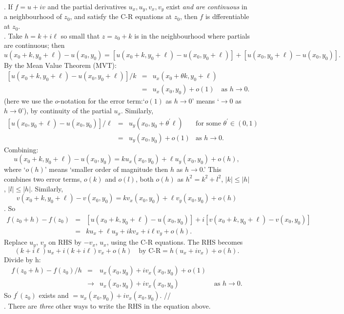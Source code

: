\documentclass[12pt]{article}
\begin{document}
.  If $f=u+iv$ and the partial derivatives
$u_x,u_y,v_x,v_y$ exist \emph{and are continuous} in a
neighbourhood of $z_0$, and satisfy the C-R equations at $z_0$,
then $f$ is dfferentiable at $z_0$.\\

. Take $h=k+i\ell$ so small that $z=z_0+k$ is in
the neighbourhood where partials are continuous; then
\[u(x_0+k,y_0+\ell)-u(x_0,y_0)=[u(x_0+k,y_0+\ell)-u(x_0,y_0+\ell)]
+[u(x_0,y_0+\ell)-u(x_0,y_0)]. \]
By the Mean Value Theorem (MVT):
\[\begin{array}{rcl}
[u(x_0+k,y_0+\ell)-u(x_0,y_0+\ell)]/k &=&u_x(x_0+\theta k,y_0+\ell)\\
&=&u_x(x_0,y_0)+o(1)\quad \textrm{as }h\rightarrow 0.
\end{array}\]
(here we use the $o$-notation for the error term:`$o(1)$ as
$h\rightarrow 0$' means `$\rightarrow 0$ as $h\rightarrow 0$'), by
continuity of the partial $u_x$. Similarly,
\[\begin{array}{rcll}
[u(x_0,y_0+\ell)-u(x_0,y_0)]/\ell &=&u_y(x_0,y_0+\theta^{'}\ell)&\textrm{for some }
\theta^{'}\in(0,1)\\
&=&u_y(x_0,y_0)+o(1)& \textrm{as }h\rightarrow 0.
\end{array}\]
Combining:
\[u(x_0+k,y_0+\ell)-u(x_0,y_0)=ku_x(x_0,y_0)+\ell u_y(x_0,y_0)+o(h),\]
where `$o(h)$' means `smaller order of magnitude then $h$ as
$h\rightarrow0$.' This combines two error terms, $o(k)$ and
$o(l)$, both $o(h)$ as $h^2=k^2+l^2$, $|k|\leq|h|$, $|l|\leq|h|$.
Similarly,
\[v(x_0+k,y_0+\ell)-v(x_0,y_0)=kv_x(x_0,y_0)+\ell v_y(x_0,y_0)+o(h)\].
So
\[\begin{array}{rcll}
f(z_0+h)-f(z_0)
&=&[u(x_0+k,y_0+\ell)-u(x_0,y_0)]+i[v(x_0+k,y_0+\ell)-v(x_0,y_0)]\\
&=&ku_x+{\ell u_y}+ikv_x+{i\ell v_y}+o(h).
\end{array}\]
Replace $u_y$, $v_y$ on RHS by $-v_x$, $u_x$, using the C-R equations.  The RHS becomes
$$
(k+i\ell)u_x+i(k+i\ell)v_x+o(h)\quad\textrm{by C-R} = h(u_x+iv_x)+o(h).
$$
Divide by h:
\[\begin{array}{rcll}
{f(z_0+h)-f(z_0)}/h&=&u_x(x_0,y_0)+iv_x(x_0,y_0)+o(1)\\
&\rightarrow&u_x(x_0,y_0)+iv_x(x_0,y_0)&\textrm{ as }h\rightarrow
0.
\end{array}\]
So $f^{'}(z_0)$ exists and $=u_x(x_0,y_0)+iv_x(x_0,y_0)$. // \\

. There are \emph{three} other ways to write the RHS in the equation above.
\end{document}
